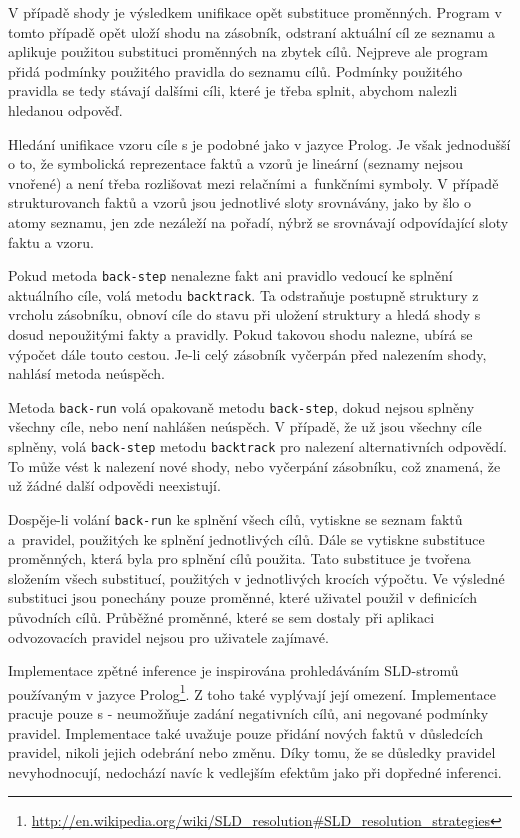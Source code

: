 V případě shody je výsledkem unifikace opět substituce proměnných. Program v
tomto případě opět uloží shodu na zásobník, odstraní aktuální cíl ze seznamu a
aplikuje použitou substituci proměnných na zbytek cílů. Nejpreve ale program
přidá podmínky použitého pravidla do seznamu cílů. Podmínky použitého pravidla
se tedy stávají dalšími cíli, které je třeba splnit, abychom nalezli hledanou
odpověď.

Hledání unifikace vzoru cíle s  je podobné jako v jazyce
Prolog. Je však jednodušší o to, že symbolická reprezentace faktů a vzorů je
lineární (seznamy nejsou vnořené) a není třeba rozlišovat mezi relačními
a~funkčními symboly. V případě strukturovanch faktů a vzorů jsou jednotlivé
sloty srovnávány, jako by šlo o atomy seznamu, jen zde nezáleží na pořadí, nýbrž
se srovnávají odpovídající sloty faktu a vzoru.

Pokud metoda \verb|back-step| nenalezne fakt ani pravidlo vedoucí ke splnění
aktuálního cíle, volá metodu \verb|backtrack|. Ta odstraňuje postupně struktury z
vrcholu zásobníku, obnoví cíle do stavu při uložení struktury a hledá shody s
dosud nepoužitými fakty a pravidly. Pokud takovou shodu nalezne, ubírá se
výpočet dále touto cestou. Je-li celý zásobník vyčerpán před nalezením shody,
nahlásí metoda neúspěch.

Metoda \verb|back-run| volá opakovaně metodu \verb|back-step|, dokud nejsou
splněny všechny cíle, nebo není nahlášen neúspěch. V případě, že už jsou všechny
cíle splněny, volá \verb|back-step| metodu \verb|backtrack| pro nalezení
alternativních odpovědí. To může vést k nalezení nové shody, nebo vyčerpání
zásobníku, což znamená, že už žádné další odpovědi neexistují.

Dospěje-li volání \verb|back-run| ke splnění všech cílů, vytiskne se seznam
faktů a~pravidel, použitých ke splnění jednotlivých cílů. Dále se vytiskne
substituce proměnných, která byla pro splnění cílů použita. Tato substituce je
tvořena složením všech substitucí, použitých v jednotlivých krocích výpočtu. Ve
výsledné substituci jsou ponechány pouze proměnné, které uživatel použil v
definicích původních cílů. Průběžné proměnné, které se sem dostaly při aplikaci
odvozovacích pravidel nejsou pro uživatele zajímavé.

Implementace zpětné inference je inspirována prohledáváním SLD-stromů používaným
v jazyce
Prolog\footnote{\url{http://en.wikipedia.org/wiki/SLD_resolution\#SLD_resolution_strategies}}.
Z toho také vyplývají její omezení. Implementace pracuje pouze s  - neumožňuje zadání negativních cílů, ani negované podmínky pravidel.
Implementace také uvažuje pouze přidání nových faktů v důsledcích pravidel,
nikoli jejich odebrání nebo změnu. Díky tomu, že se důsledky pravidel
nevyhodnocují, nedochází navíc k vedlejším efektům jako při dopředné inferenci.

